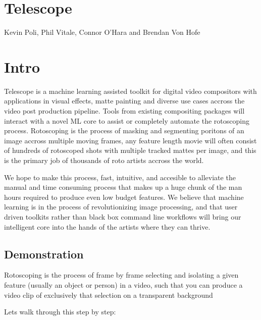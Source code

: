 \documentclass[11pt]{article}
\author{Kevin Poli}
\date{\today}
\title{}
\begin{document}
\tableofcontents

\section{Telescope}
\label{sec:org08d2e3a}
Kevin Poli, Phil Vitale, Connor O'Hara and Brendan Von Hofe
\section{Intro}
\label{sec:orgdd20d79}
Telescope is a machine learning assisted toolkit for digital video compositors
with applications in visual effects, matte painting and diverse use cases
accross the video post production pipeline. Tools from existing compositing
packages will interact with a novel ML core to assist or completely automate the
rotoscoping process. Rotoscoping is the process of masking and segmenting
poritons of an image accross multiple moving frames, any feature length movie
will often consist of hundreds of rotoscoped shots with multiple tracked mattes
per image, and this is the primary job of thousands of roto artists accross the world.

We hope to make this process, fast, intuitive, and accesible to alleviate the
manual and time consuming process that makes up a huge chunk of the man hours
required to produce even low budget features. We believe that machine learning
is in the process of revolutionizing image processing, and that user driven
toolkits rather than black box command line workflows will bring our intelligent
core into the hands of the artists where they can thrive.
\subsection{Demonstration}
\label{sec:org44dcadf}
Rotoscoping is the process of frame by frame selecting and isolating a given feature (usually
an object or person) in a video, such that you can produce a video clip of
exclusively that selection on a transparent background

Lets walk through this step by step:
\end{document}

